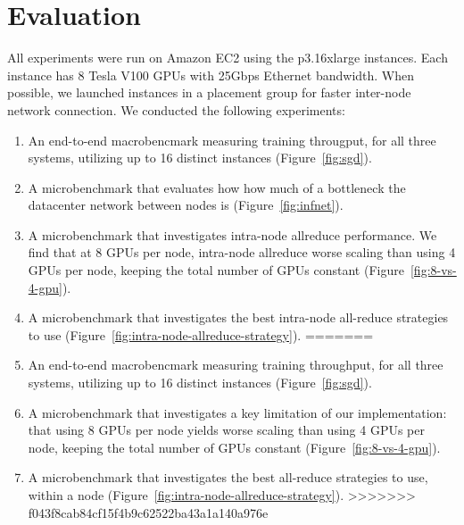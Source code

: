 \section{Evaluation}
All experiments were run on Amazon EC2 using the p3.16xlarge instances.  Each instance has 8 Tesla V100 GPUs with 25Gbps Ethernet bandwidth.  When possible, we launched instances in a placement group for faster inter-node network connection.  We conducted the following experiments:

\begin{enumerate}
<<<<<<< HEAD
    \item An end-to-end macrobencmark measuring training througput, for all three systems, utilizing up to 16 distinct instances (Figure~\ref{fig:sgd}).
    \item A microbenchmark that evaluates how how much of a bottleneck the datacenter network between nodes is (Figure~\ref{fig:infnet}).
    \item A microbenchmark that investigates intra-node allreduce performance. We find that at 8 GPUs per node, intra-node allreduce worse scaling than using 4 GPUs per node, keeping the total number of GPUs constant (Figure~\ref{fig:8-vs-4-gpu}).
    \item A microbenchmark that investigates the best intra-node all-reduce strategies to use (Figure~\ref{fig:intra-node-allreduce-strategy}).
=======
    \item An end-to-end macrobencmark measuring training throughput, for all three systems, utilizing up to 16 distinct instances (Figure~\ref{fig:sgd}).
    \item A microbenchmark that investigates a key limitation of our implementation: that using 8 GPUs per node yields worse scaling than using 4 GPUs per node, keeping the total number of GPUs constant (Figure~\ref{fig:8-vs-4-gpu}).
    \item A microbenchmark that investigates the best all-reduce strategies to use, within a node (Figure~\ref{fig:intra-node-allreduce-strategy}).
>>>>>>> f043f8cab84cf15f4b9c62522ba43a1a140a976e
\end{enumerate}


